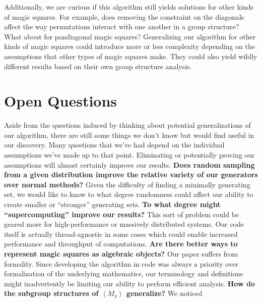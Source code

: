 \documentclass[12pt]{report}
\begin{document}
\par Additionally, we are curious if this algorithm still yields solutions for other kinds of magic
squares. For example, does removing the constraint on the diagonals affect the way permutations
interact with one another in a group structure? What about for pandiagonal magic squares?
Generalizing our algorithm for other kinds of magic squares could introduce more or less complexity
depending on the assumptions that other types of magic squares make. They could also yield wildly
different results based on their own group structure analysis.

\section{Open Questions}

\indent Aside from the questions induced by thinking about potential generalizations of our
algorithm, there are still some things we don't know but would find useful in our discovery. Many
questions that we've had depend on the individual assumptions we've made up to that point.
Eliminating or potentially proving our assumptions will almost certainly improve our results.
\linebreak
\linebreak
\textbf{Does random sampling from a given distribution improve the relative variety of our
  generators over normal methods?} Given the difficulty of finding a minimally generating set, we
would like to know to what degree randomness could affect our ability to create smaller or
``stronger'' generating sets.
\linebreak
\linebreak
\textbf{To what degree might ``supercomputing'' improve our results?} This sort of problem could be
geared more for high-performance or massively distributed systems. Our code itself is actually
thread-agnostic in some cases which could enable increased performance and throughput of
computations.
\linebreak
\linebreak
\textbf{Are there better ways to represent magic squares as algebraic objects?} Our paper suffers
from formality. Since developing the algorithm in code was always a priority over formalization of
the underlying mathematics, our terminology and definitions might inadvertently be limiting our
ability to perform efficient analysis.
\linebreak
\linebreak
\textbf{How do the subgroup structures of $\left\langle M_4 \right\rangle$ generalize?} We noticed
\end{document}
